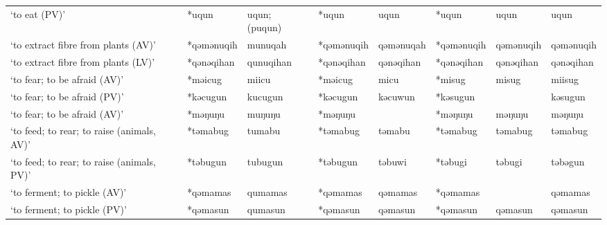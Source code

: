 \begin{landscape}
\begin{longtable}[c]{@{}p{3cm}<{\raggedright}p{2.75cm}<{\raggedright}p{2.75cm}<{\raggedright}p{2.75cm}<{\raggedright}p{2.75cm}<{\raggedright}p{2.75cm}<{\raggedright}p{2.75cm}<{\raggedright}p{2.75cm}<{\raggedright}@{}}
`to eat (PV)'                                        & *uqun              & uqun; (puqun)                  & *uqun              & uqun                       & *uqun            & uqun                     & uqun                              \\
`to extract fibre from plants (AV)'                  & *qəmənuqih         & munuqah                        & *qəmənuqih         & qəmənuqah                  & *qəmənuqih       & qəmənuqih                & qəmənuqih                         \\
`to extract fibre from plants (LV)'                  & *qənəqihan         & qunuqihan                      & *qənəqihan         & qənəqihan                  & *qənəqihan       & qənəqihan                & qənəqihan                         \\
`to fear; to be afraid (AV)'                         & *məicug            & miicu                          & *məicug            & micu                       & *misug           & misug                    & miisug                            \\
`to fear; to be afraid (PV)'                         & *kəcugun           & kucugun                        & *kəcugun           & kəcuwun                    & *kəsugun         &                          & kəsugun                           \\
`to fear; to be afraid (AV)'                         & *məŋuŋu            & muŋuŋu                         & *məŋuŋu            &                            & *məŋuŋu          & məŋuŋu                   & məŋuŋu                            \\
`to feed; to rear; to raise (animals, AV)'           & *təmabug           & tumabu                         & *təmabug           & təmabu                     & *təmabug         & təmabug                  & təmabug                           \\
`to feed; to rear; to raise (animals, PV)'           & *təbugun           & tubugun                        & *təbugun           & təbuwi                     & *təbugi          & təbugi                   & təbəgun                           \\
`to ferment; to pickle (AV)'                         & *qəmamas           & qumamas                        & *qəmamas           & qəmamas                    & *qəmamas         &                          & qəmamas                           \\
`to ferment; to pickle (PV)'                         & *qəmasun           & qumasun                        & *qəmasun           & qəmasun                    & *qəmasun         & qəmasun                  & qəmasun                           \\

\end{longtable}
\end{landscape}
